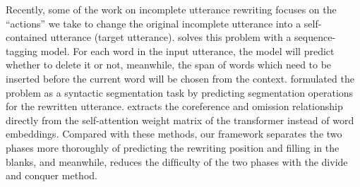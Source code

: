 Recently, some of the work on 
incomplete utterance rewriting 
focuses on the ``actions'' we
take to change the original
incomplete utterance
into a self-contained
utterance (target utterance).
\citet{hao-etal-2021-rast} 
solves this problem  
with a sequence-tagging model.
For each word in the input utterance, 
the model will predict whether to
delete it or not, meanwhile, the
span of words which need to be inserted before
the current word will 
be chosen from the context.
\citet{liu-etal-2020-incomplete} 
formulated the problem as 
a syntactic segmentation task
by predicting 
segmentation
operations for 
the rewritten utterance.
\citet{DBLP:conf/icassp/ZhangLWCX22} extracts the coreference and omission relationship directly from the self-attention weight matrix of the transformer instead of word embeddings. Compared with these methods, our framework separates the two phases more thoroughly of predicting the rewriting position and ﬁlling in the blanks, and meanwhile, reduces the difﬁculty of the two phases with the divide and conquer method.
